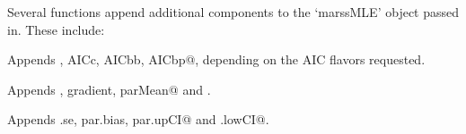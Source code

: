 Several functions append additional components to the `marssMLE' object passed in. These include:

  \begin{description}
  \item{\verb@MARSSaic@}{ Appends \verb@AIC, AICc, AICbb, AICbp@, depending on the AIC flavors requested. }
  \item{\verb@MARSShessian@}{ Appends \verb@Hessian, gradient, parMean@ and \verb@parSigma@. }
  \item{\verb@MARSSparamCIs@}{ Appends \verb@par.se, par.bias, par.upCI@ and \verb@par.lowCI@.}
  \end{description}

